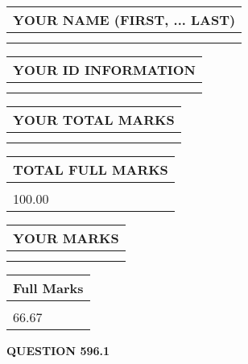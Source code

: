 \documentclass{ctexart}
\begin{document}
   
   
   
\newpage 
\setcounter{page}{ 
   596001 } 
   
   
   
   
\noindent\begin{tabular}{|l|}
\hline
YOUR NAME (FIRST, ... LAST)  \\
\hline
 \\ 
 \\ 
\hline
\end{tabular}
\hspace{0.05in} \begin{tabular}{|l|}
\hline
 YOUR   ID   INFORMATION  \\
\hline
 \\ 
 \\ 
\hline
\end{tabular}
   
   
\vspace{0.2in}\noindent\begin{tabular}{|l|}
\hline
YOUR TOTAL MARKS  \\
\hline
 \\ 
 \\ 
\hline
\end{tabular}
\hspace{0.05in} \begin{tabular}{|l|}
\hline
TOTAL FULL MARKS  \\
\hline
 \\ 
100.00 \\
\hline
\end{tabular}
   
   
 \vspace{0.2in}
 
 
 
 
   
   
  
\vspace{0.2in}
  
\noindent\begin{tabular}{|l|}
\hline
 YOUR MARKS  \\
\hline
 \\ 
 \\ 
\hline
\end{tabular}
\hspace{0.05in} \begin{tabular}{|l|}
\hline
 Full Marks  \\
\hline
 \\ 
66.67 \\
\hline
\end{tabular}
{\textbf{\Large{QUESTION
596.1 
}}}
  
\end{document}
